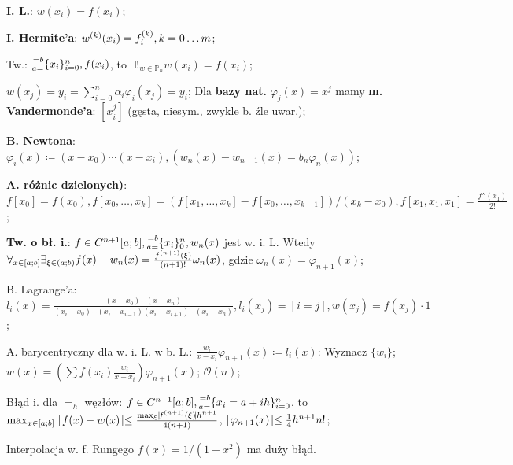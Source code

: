 
\entry
\textbf{I. L.}:
$w(x_i) = f(x_i)$;

\entry
\textbf{I. Hermite'a}:
$w^{(k)}(x_i) = f^{(k)}_i, k = 0 \ldots m$;

\entry
Tw.:
$\ipoints[i=0][n][a=][=b]{x_i}, f(x_i)$,
to
$\exists!_{w \in \mathbb{P}_n} w(x_i)=f(x_i)$;

\entry
$w(x_j) = y_i = \sum_{i=0}^n\alpha_i\varphi_i(x_j) = y_i$;
\entry
Dla \textbf{bazy nat.}
$\varphi_j(x)=x^j$
mamy \textbf{m. Vandermonde'a}:
$[x^j_i]$
(gęsta, niesym., zwykle b. źle uwar.);

\entry
\textbf{B. Newtona}:
$\varphi_i(x) \coloneqq (x-x_0)\cdots(x-x_i),
(w_n(x)-w_{n-1}(x) = b_n\varphi_n(x))$;

\entry
\textbf{A. różnic dzielonych)}:
$
f[x_0] = f(x_0),
f[x_0,\ldots,x_k] = (f[x_1,\ldots,x_k] - f[x_0,\ldots,x_{k-1}])/(x_k - x_0),
f[x_1, x_1, x_1] = \frac{f''(x_1)}{2!}
$;


\textbf{Tw. o bł. i.}:
$f\in C^{n+1}[a;b], \ipoints[0][n][a=][=b]{x_i}, w_n(x)$ jest w. i. L.
Wtedy
$\forall_{x \in [a;b]} \exists_{\xi \in (a;b)} f(x) - w_n(x) = \frac{f^{(n+1)}(\xi)}{(n+1)!}\omega_n(x)$,
gdzie $\omega_n(x)=\varphi_{n+1}(x)$;


\entry
B. Lagrange'a:
$
l_i(x) = \frac{(x-x_0)\cdots(x-x_n)}{(x_i - x_0)\cdots(x_i - x_{i-1})(x_i - x_{i+1}) \cdots (x_i - x_n)},
l_i(x_j) = [i=j],
w(x_j)=f(x_j)\cdot 1
$;

\entry
A. barycentryczny dla w. i. L. w b. L.:
$\frac{w_i}{x - x_i}\varphi_{n+1}(x) \coloneqq l_i(x)$:
Wyznacz
$\{w_i\}$;
$w(x) = (\sum f(x_i)\frac{w_i}{x - x_i})\varphi_{n+1}(x)$;
$\mathcal{O}(n)$;

\entry
Błąd i. dla $=_h$ węzłów:
$f \in C^{n+1}[a;b], \ipoints[i=0][n][a=][=b]{x_i=a+ih}$, to
$\max_{x \in [a;b]}\mid\! f(x)-w(x)\! \mid \leq \frac{\max_\xi\mid\! f^{(n+1)}(\xi)\! \mid h^{n+1}}{4(n+1)}$,
$\mid\! \varphi_{n+1}(x)\! \mid \leq \frac{1}{4} h^{n+1} n!$;

\entry
Interpolacja w. f. Rungego
$f(x)=1/(1+x^2)$
ma duży błąd.
